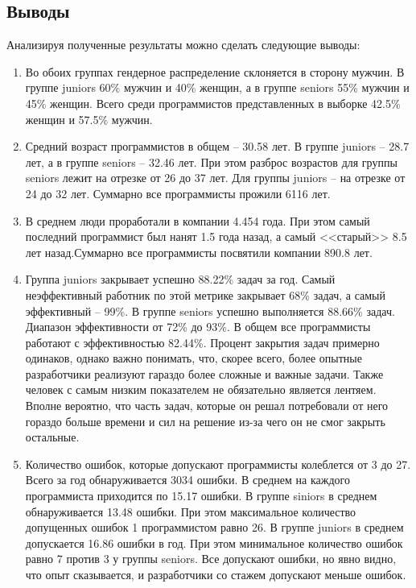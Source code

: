 \subsection{Выводы}
Анализируя полученные результаты можно сделать следующие выводы:

\begin{enumerate}
	\item Во обоих группах гендерное распределение склоняется в сторону мужчин. В группе juniors 60\% мужчин и 40\% женщин, а в группе seniors 55\% мужчин и 45\% женщин. Всего среди программистов представленных в выборке 42.5\% женщин и 57.5\% мужчин.
	
	\item Средний возраст программистов в общем -- 30.58 лет. В группе juniors -- 28.7 лет, а в группе seniors -- 32.46 лет. При этом разброс возрастов для группы seniors лежит на отрезке от 26 до 37 лет. Для группы juniors -- на отрезке от 24 до 32 лет. Суммарно все программисты прожили 6116 лет.
	
	\item В среднем люди проработали в компании 4.454 года. При этом самый последний программист был нанят 1.5 года назад, а самый <<старый>> 8.5 лет назад.Суммарно все программисты посвятили компании 890.8 лет.
	
	\item Группа juniors закрывает успешно 88.22\% задач за год. Самый неэффективный работник по этой метрике закрывает 68\% задач, а самый эффективный -- 99\%. В группе seniors успешно выполняется 88.66\% задач. Диапазон эффективности от 72\% до 93\%. В общем все программисты работают с эффективностью 82.44\%. Процент закрытия задач примерно одинаков, однако важно понимать, что, скорее всего, более опытные разработчики реализуют гараздо более сложные и важные задачи. Также человек с самым низким показателем не обязательно является лентяем. Вполне вероятно, что часть задач, которые он решал потребовали от него гораздо больше времени и сил на решение из-за чего он не смог закрыть остальные.
	
	\item Количество ошибок, которые допускают программисты колеблется от 3 до 27. Всего за год обнаруживается 3034 ошибки. В среднем на каждого программиста приходится по 15.17 ошибки. В группе siniors в среднем обнаруживается 13.48 ошибки. При этом максимальное количество допущенных ошибок 1 программистом равно 26. В группе juniors в среднем допускается 16.86 ошибки в год. При этом минимальное количество ошибок равно 7 против 3 у группы seniors. Все допускают ошибки, но явно видно, что опыт сказывается, и разработчики со стажем допускают меньше ошибок.
	

\end{enumerate}

